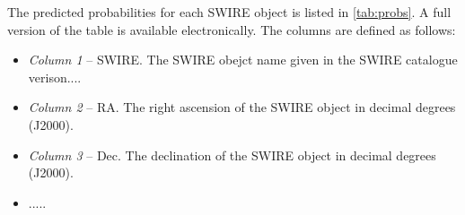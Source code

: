 \documentclass[fleqn,usenatbib,usedcolumn]{mnras}
\begin{document}
  The predicted probabilities for each SWIRE object is listed in \autoref{tab:probs}. A full version of the table is available electronically.  The columns are defined as follows:
 \begin{itemize}
\item {\em Column 1}  -- SWIRE. The SWIRE obejct name given in the SWIRE catalogue verison....
\item {\em Column 2} -- RA. The right ascension of the SWIRE object in decimal degrees (J2000).
\item {\em Column 3} -- Dec. The declination of the SWIRE object in decimal degrees (J2000).
\item .....
\end{itemize}
  
\bsp	%
\label{lastpage}
\end{document}

